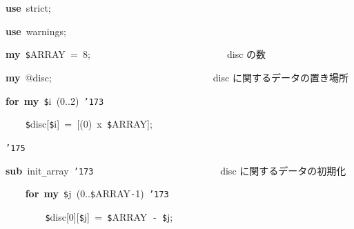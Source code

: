 \documentclass[a4paper,10pt]{article}
\def\mc{\relax}
\begin{document}
\noindent
\mbox{}\hfill

\noindent
\mbox{}\textbf{use}{\tt\mc \ }strict;

\noindent
\mbox{}\textbf{use}{\tt\mc \ }warnings;

\noindent
\mbox{}\hfill

\noindent
\mbox{}\textbf{my}{\tt\mc \ }{\tt\$}ARRAY{\tt\mc \ }={\tt\mc \ }8;{\tt\mc \ }{\tt\mc \ }{\tt\mc \ }{\tt\mc \ }{\tt\mc \ }{\tt\mc \ }{\tt\mc \ }{\tt\mc \ }{\tt\mc \ }{\tt\mc \ }{\tt\mc \ }{\tt\mc \ }{\tt\mc \ }{\tt\mc \ }{\tt\mc \ }{\tt\mc \ }{\tt\mc \ }{\tt\mc \ }{\tt\mc \ }{\tt\mc \ }{\tt\mc \ }{\tt\mc \ }{\tt\mc \ }{\tt\mc \ }{\tt\mc \ }{\tt\mc \ }\rm\mc {\tt\#} \ disc の数 \hfill 
\tt\mc 

\noindent
\mbox{}\hfill

\noindent
\mbox{}\textbf{my}{\tt\mc \ }@disc;{\tt\mc \ }{\tt\mc \ }{\tt\mc \ }{\tt\mc \ }{\tt\mc \ }{\tt\mc \ }{\tt\mc \ }{\tt\mc \ }{\tt\mc \ }{\tt\mc \ }{\tt\mc \ }{\tt\mc \ }{\tt\mc \ }{\tt\mc \ }{\tt\mc \ }{\tt\mc \ }{\tt\mc \ }{\tt\mc \ }{\tt\mc \ }{\tt\mc \ }{\tt\mc \ }{\tt\mc \ }{\tt\mc \ }{\tt\mc \ }{\tt\mc \ }{\tt\mc \ }{\tt\mc \ }{\tt\mc \ }{\tt\mc \ }{\tt\mc \ }{\tt\mc \ }\rm\mc {\tt\#} \ disc に関するデータの置き場所\hfill 
\tt\mc 

\noindent
\mbox{}\textbf{for}{\tt\mc \ }\textbf{my}{\tt\mc \ }{\tt\$}i{\tt\mc \ }(0..2){\tt\mc \ }{\tt\char'173}

\noindent
\mbox{}{\tt\mc \ }{\tt\mc \ }{\tt\mc \ }{\tt\mc \ }{\tt\$}disc[{\tt\$}i]{\tt\mc \ }={\tt\mc \ }[(0){\tt\mc \ }x{\tt\mc \ }{\tt\$}ARRAY];

\noindent
\mbox{}{\tt\char'175}

\noindent
\mbox{}\hfill

\noindent
\mbox{}\textbf{sub}{\tt\mc \ }init{\tt\_}array{\tt\mc \ }{\tt\char'173}{\tt\mc \ }{\tt\mc \ }{\tt\mc \ }{\tt\mc \ }{\tt\mc \ }{\tt\mc \ }{\tt\mc \ }{\tt\mc \ }{\tt\mc \ }{\tt\mc \ }{\tt\mc \ }{\tt\mc \ }{\tt\mc \ }{\tt\mc \ }{\tt\mc \ }{\tt\mc \ }{\tt\mc \ }{\tt\mc \ }{\tt\mc \ }{\tt\mc \ }{\tt\mc \ }{\tt\mc \ }{\tt\mc \ }{\tt\mc \ }\rm\mc {\tt\#} \ disc に関するデータの初期化\hfill 
\tt\mc 

\noindent
\mbox{}{\tt\mc \ }{\tt\mc \ }{\tt\mc \ }{\tt\mc \ }\textbf{for}{\tt\mc \ }\textbf{my}{\tt\mc \ }{\tt\$}j{\tt\mc \ }(0..{\tt\$}ARRAY{\tt -}1){\tt\mc \ }{\tt\char'173}

\noindent
\mbox{}{\tt\mc \ }{\tt\mc \ }{\tt\mc \ }{\tt\mc \ }{\tt\mc \ }{\tt\mc \ }{\tt\mc \ }{\tt\mc \ }{\tt\$}disc[0][{\tt\$}j]{\tt\mc \ }={\tt\mc \ }{\tt\$}ARRAY{\tt\mc \ }{\tt -}{\tt\mc \ }{\tt\$}j;
\end{document}
